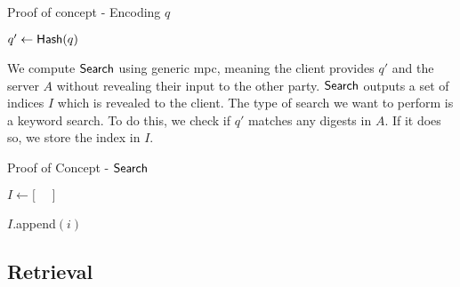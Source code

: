 \begin{algorithm}[tbh]
    \LinesNumbered
    \caption{Proof of concept - Encoding $ q $}
    \label{algo:EncodingTheSearchQuery}

    \vspace*{0.48cm}

    {$ q' \gets \mathsf{Hash}{(q)} $}

    \vspace*{0.48cm}

\end{algorithm}

We compute $ \mathsf{{Search}} $ using generic \acrshort{mpc}, meaning the client provides $ q' $ and the server $ A $ without revealing their input to the other party.  $ \mathsf{{Search}} $ outputs a set of indices $ I $ which is revealed to the client. The type of search we want to perform is a keyword search. To do this, we check if $ q' $ matches any digests in $ A $. If it does so, we store the index in $ I $.

\begin{algorithm}[tbh]
    \LinesNumbered
    \caption{Proof of Concept - $ \mathsf{{Search}} $}
    \label{algo:Searching}

    \vspace*{0.48cm}

    {$ I \gets \lbrack \phantom{=} \rbrack $}

     {

         {
             {
                $ I $.append$\left(i\right)$
            }
        }
    }

    \vspace*{0.48cm}

\end{algorithm}

\subsection*{\thesubsection\quad Retrieval}\label{subsec:ProofOfConceptRetrieval}


